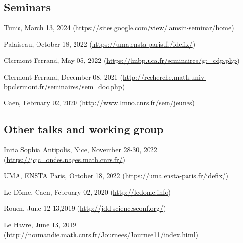 \documentclass[10pt]{article} %
\begin{document}
\subsection{Seminars}

{Tunis, March 13, 2024 (\href{https://sites.google.com/view/lamsin-seminar/home}{https://sites.google.com/view/lamsin-seminar/home})}

{Palaiseau, October 18, 2022 (\href{https://uma.ensta-paris.fr/idefix/}{https://uma.ensta-paris.fr/idefix/})}

{Clermont-Ferrand, May 05, 2022 (\href{https://lmbp.uca.fr/seminaires/gt_edp.php}{https://lmbp.uca.fr/seminaires/gt\_edp.php})}

{Clermont-Ferrand, December 08,  2021 (\href{http://recherche.math.univ-bpclermont.fr/seminaires/sem\_doc.php}{http://recherche.math.univ-bpclermont.fr/seminaires/sem\_doc.php})}

{Caen, February 02,  2020 (\href{http://www.lmno.cnrs.fr/sem/jeunes}{http://www.lmno.cnrs.fr/sem/jeunes}) }



\subsection{Other talks and working group}

{Inria Sophia Antipolis, Nice,  November 28-30,  2022 (\href{https://jcjc\_ondes.pages.math.cnrs.fr/}{https://jcjc\_ondes.pages.math.cnrs.fr/})}

{UMA, ENSTA Paris, October 18, 2022 (\href{https://uma.ensta-paris.fr/idefix/}{https://uma.ensta-paris.fr/idefix/})}


{Le Dôme, Caen, February 02,  2020 (\href{http://ledome.info/index.php?page=page&id_manifestation=2295}{http://ledome.info}) }

{Rouen, June 12-13,2019 (\href{https://jdd.sciencesconf.org/}{http://jdd.sciencesconf.org/}) }

{Le Havre, June 13, 2019 (\href{http://normandie.math.cnrs.fr/Journees/Journee11/index.html}{http://normandie.math.cnrs.fr/Journees/Journee11/index.html}) }
\end{document}
